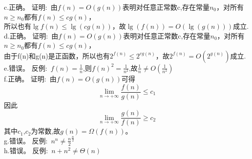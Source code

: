 \documentclass[19pt]{article}
\begin{document}
\indent c.正确。 证明:\ 由$f(n)=O(g(n))$表明对任意正常数c,存在常量$n_0$，对所有$n\ge n_0$都有$f(n)\le cg(n)$，\\
所以也有$\lg f(n)\le\lg (cg(n))$，故$\lg (f(n))=O(\lg (g(n))) $成立.\\
\indent d.正确。 证明:\ 由$f(n)=O(g(n))$表明对任意正常数c,存在常量$n_0$，对所有$n\ge n_0$都有$f(n)\le cg(n)$，\\
由于f(n)和g(n)是正函数，所以也有$2^{f(n)}\le2^{cg(n)}$，故$2^{f(n)}=O(2^{g(n)}) $成立.\\
\indent e.错误。 反例:\ $f(n)=\frac{1}{n}$,则$f(n)^2=\frac{1}{n^2}$,故$\frac{1}{n}\ne O(\frac{1}{n^2})$\\
\indent f.正确。 证明:\ 由$f(n)=O(g(n))$可得$${ \lim_{n \to +\infty} \frac{f(n)}{g(n)} \le c_1}$$因此
$${ \lim_{n \to +\infty} \frac{g(n)}{f(n)} \ge c_2}$$
\indent 其中$c_1$,$c_2$为常数,故$g(n)=\Omega(f(n))$。\\
\indent g.错误。 反例:\ $n^n\ne \frac{n}{2}^{\frac{n}{2}}$\\
\indent h.错误。 反例:\ $n+n^2\ne \Theta(n)$
\end{document}
